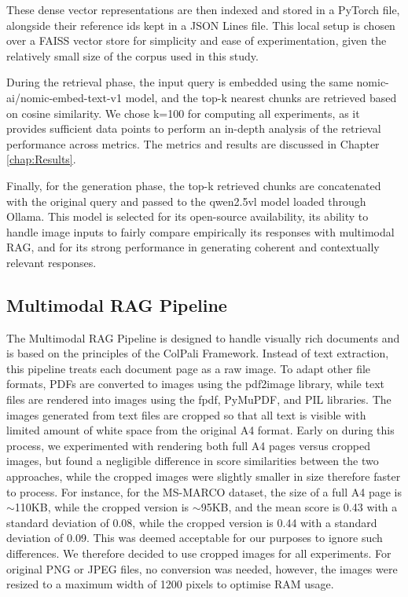 \documentclass[12pt,twoside]{report}
\begin{document}
These dense vector representations are then indexed and stored in a PyTorch file, alongside their reference ids kept in a JSON Lines file. This local setup is chosen over a FAISS vector store for simplicity and ease of experimentation, given the relatively small size of the corpus used in this study.

During the retrieval phase, the input query is embedded using the same nomic-ai/nomic-embed-text-v1 model, and the top-k nearest chunks are retrieved based on cosine similarity. We chose k=100 for computing all experiments, as it provides sufficient data points to perform an in-depth analysis of the retrieval performance across metrics. The metrics and results are discussed in Chapter \ref{chap:Results}.

Finally, for the generation phase, the top-k retrieved chunks are concatenated with the original query and passed to the qwen2.5vl model loaded through Ollama. This model is selected for its open-source availability, its ability to handle image inputs to fairly compare empirically its responses with multimodal RAG, and for its strong performance in generating coherent and contextually relevant responses.

\subsection{Multimodal RAG Pipeline}

The Multimodal RAG Pipeline is designed to handle visually rich documents and is based on the principles of the ColPali Framework.\cite{ColPali} Instead of text extraction, this pipeline treats each document page as a raw image. To adapt other file formats, PDFs are converted to images using the pdf2image library, while text files are rendered into images using the fpdf, PyMuPDF, and PIL libraries. The images generated from text files are cropped so that all text is visible with limited amount of white space from the original A4 format. Early on during this process, we experimented with rendering both full A4 pages versus cropped images, but found a negligible difference in score similarities between the two approaches, while the cropped images were slightly smaller in size therefore faster to process. For instance, for the MS-MARCO dataset, the size of a full A4 page is $\sim$110KB, while the cropped version is $\sim$95KB, and the mean score is 0.43 with a standard deviation of 0.08, while the cropped version is 0.44 with a standard deviation of 0.09. This was deemed acceptable for our purposes to ignore such differences. We therefore decided to use cropped images for all experiments. For original PNG or JPEG files, no conversion was needed, however, the images were resized to a maximum width of 1200 pixels to optimise RAM usage.
\end{document}
